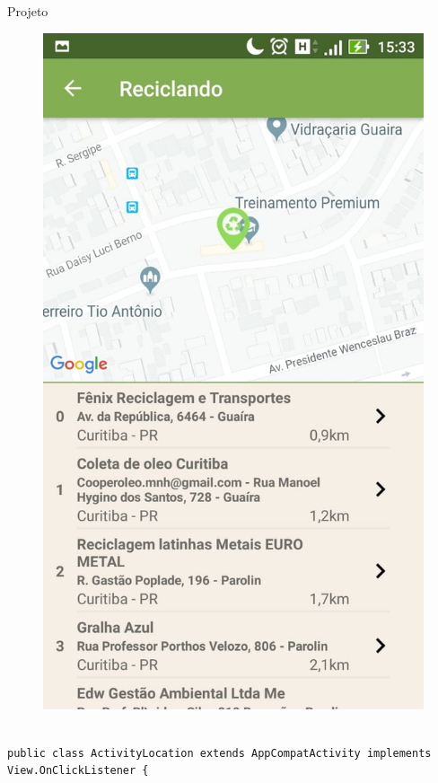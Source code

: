 \documentclass[
	12pt,				%
	openright,			%
	twoside,			%
	a4paper,			%
	english,			%
	french,				%
	spanish,			%
	brazil				%
	]{abntex2}
\begin{document}
\begin{chapter}{Projeto}
\begin{figure}[htb]
\begin{minipage}{0.45\textwidth}
    \includegraphics[scale=0.35]{media/tela_location_2.jpg}
     \label{fig:tela_location_2}
  \end{minipage}
\end{figure}


\begin{lstlisting}[numbers=none,basicstyle=\small,
caption={ActivityLocation.java},
title={ActivityLocation.java},
label={ActivityLocation.java}]

public class ActivityLocation extends AppCompatActivity implements View.OnClickListener {



\end{lstlisting}
\end{chapter}
\end{document}
